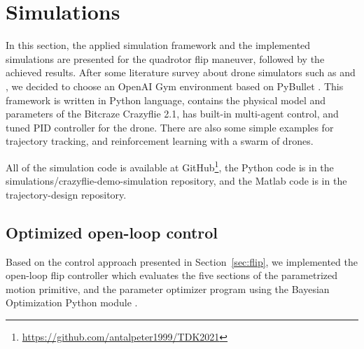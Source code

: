 \section{Simulations}

In this section, the applied simulation framework and the implemented simulations are presented for the quadrotor flip maneuver, followed by the achieved results. After some literature survey about drone simulators such as \cite{airsim2017} and \cite{flightmare2020}, we decided to choose an OpenAI Gym environment based on PyBullet \cite{gym}. This framework is written in Python language, contains the physical model and parameters of the Bitcraze Crazyflie 2.1, has built-in multi-agent control, and tuned PID controller for the drone. There are also some simple examples for trajectory tracking, and reinforcement learning with a swarm of drones.

All of the simulation code is available at GitHub\footnote{\url{https://github.com/antalpeter1999/TDK2021}}, the Python code is in the simulations/crazyflie-demo-simulation repository, and the Matlab code is in the trajectory-design repository.

\subsection{Optimized open-loop control}\label{sec:opensimu}

Based on the control approach presented in Section~\ref{sec:flip}, we implemented the open-loop flip controller which evaluates the five sections of the parametrized motion primitive, and the parameter optimizer program using the Bayesian Optimization Python module \cite{bayesopt}.%

